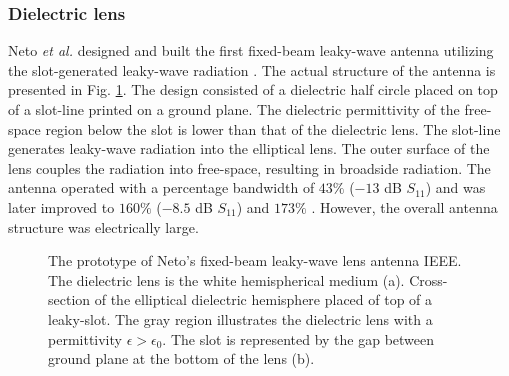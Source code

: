 \subsubsection{Dielectric lens}
Neto \textit{et al.} designed and built the first fixed-beam leaky-wave antenna utilizing the slot-generated leaky-wave radiation \cite{Neto2005}. The actual structure of the antenna is presented in Fig. \ref{fig:elliptical}. The design consisted of a dielectric half circle placed on top of a slot-line printed on a ground plane. The dielectric permittivity of the free-space region below the slot is lower than that of the dielectric lens. The slot-line generates leaky-wave radiation into the elliptical lens. The outer surface of the lens couples the radiation into free-space, resulting in broadside radiation. The antenna operated with a percentage bandwidth of $43\%$ ($-13$ dB $S_{11}$) and was later improved to $160\%$ ($-8.5$ dB $S_{11}$) \cite{Bruni2007} and $173\%$ \cite{Neto2010_2}. However, the overall antenna structure was electrically large. 

\begin{figure} [t!]
\centering
\noindent
\hspace*{\fill}%
	\mbox{}
%
\hspace*{\fill}%
%
\mbox{}%

\caption[The prototype of Neto's fixed-beam leaky-wave lens antenna and a diagram demonstrating its radiation towards broadside.]{The prototype of Neto's fixed-beam leaky-wave lens antenna \cite{Neto2010_2}  IEEE. The dielectric lens is the white hemispherical medium (a). Cross-section of the elliptical dielectric hemisphere placed of top of a leaky-slot. The gray region illustrates the dielectric lens with a permittivity $\epsilon>\epsilon_0$. The slot is represented by the gap between ground plane at the bottom of the lens (b).}
\label{fig:elliptical} 
\end{figure}

